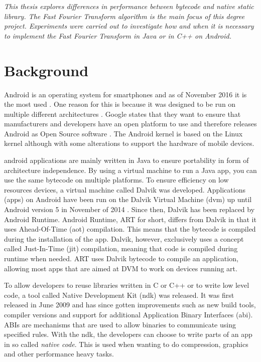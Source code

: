 \textit{This thesis explores differences in performance between bytecode and native static library. The Fast Fourier Transform algorithm is the main focus of this degree project. Experiments were carried out to investigate how and when it is necessary to implement the Fast Fourier Transform in Java or in C++ on Android.}

\section{Background}
Android is an operating system for smartphones and as of November 2016 it is the most used \cite{android:os:popularity}. One reason for this is because it was designed to be run on multiple different architectures \cite{android:os:devices}. Google states that they want to ensure that manufacturers and developers have an open platform to use and therefore releases Android as Open Source software \cite{android:os:opensource}. The Android kernel is based on the Linux kernel although with some alterations to support the hardware of mobile devices.

\gls{android} applications are mainly written in Java to ensure portability in form of architecture independence. By using a virtual machine to run a Java app, you can use the same bytecode on multiple platforms. To ensure efficiency on low resources devices, a virtual machine called Dalvik was developed. Applications (apps) on Android have been run on the Dalvik Virtual Machine (\gls{dvm}) up until Android version 5 \cite{android:dalvik} in November of 2014 \cite{android:dalvik:release}. Since then, Dalvik has been replaced by Android Runtime. Android Runtime, ART for short, differs from Dalvik in that it uses Ahead-Of-Time (\gls{aot}) compilation. This means that the bytecode is compiled during the installation of the app. Dalvik, however, exclusively uses a concept called Just-In-Time (\gls{jit}) compilation, meaning that code is compiled during runtime when needed. ART uses Dalvik bytecode to compile an application, allowing most apps that are aimed at DVM to work on devices running \gls{art}.

To allow developers to reuse libraries written in C or C++ or to write low level code, a tool called Native Development Kit (\gls{ndk}) was released. It was first released in June 2009 \cite{Lin2011} and has since gotten improvements such as new build tools, compiler versions and support for additional Application Binary Interfaces (\gls{abi}). ABIs are mechanisms that are used to allow binaries to communicate using specified rules. With the \gls{ndk}, the developers can choose to write parts of an app in so called \emph{native code}. This is used when wanting to do compression, graphics and other performance heavy tasks.


